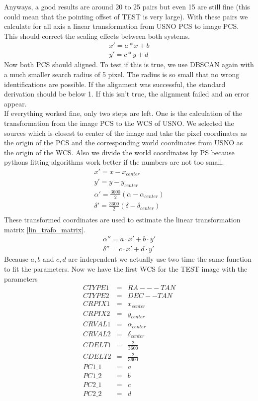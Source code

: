 Anyways, a good results are around 20 to 25 pairs but even 15 are still fine (this could mean that the pointing offset of TEST is very large). With these pairs we calculate for all axis a linear transformation from USNO PCS to image PCS. This should correct the scaling effects between both systems.
\begin{eqnarray}
	x' = a*x+b\\
	y' = c*y+d
\end{eqnarray}
Now both PCS should aligned. To test if this is true, we use DBSCAN again with a much smaller search radius of 5 pixel. The radius is so small that no wrong identifications are possible. If the alignment was successful, the standard derivation should be below 1. If this isn't true, the alignment failed and an error appear.\\
If everything worked fine, only two steps are left. One is the calculation of the transformation from the image PCS to the WCS of USNO. We selected the sources which is closest to center of the image and take the pixel coordinates as the origin of the PCS and the corresponding world coordinates from USNO as the origin of the WCS. Also we divide the world coordinates by PS because pythons fitting algorithms work better if the numbers are not too small.
\begin{eqnarray}
	x' = x - x_{center}\\
	y' = y - y_{center}\\
	\alpha ' = \frac{3600}{2}(\alpha - \alpha_{center})\\
	\delta ' = \frac{3600}{2}(\delta - \delta_{center})\\
\end{eqnarray}
These transformed coordinates are used to estimate the linear transformation matrix \eqref{lin_trafo_matrix}.
\begin{eqnarray}
	\alpha '' = a \cdot x' + b \cdot y' \\
	\delta '' = c \cdot x' + d \cdot y'
	\label{lin_trafo_matrix}
\end{eqnarray}
Because $a, b$ and $c, d$ are independent we actually use two time the same function to fit the parameters. Now we have the first WCS for the TEST image with the parameters
\begin{eqnarray}
	CTYPE1 &=& RA---TAN\\
	CTYPE2 &=& DEC--TAN\\
	CRPIX1 &=& x_{center}\\
	CRPIX2 &=& y_{center}\\
	CRVAL1 &=& \alpha_{center}\\
	CRVAL2 &=& \delta_{center}\\
	CDELT1 &=& \frac{2}{3600}\\
	CDELT2 &=& \frac{2}{3600}\\
	PC1\_1 &=& a\\
	PC1\_2 &=& b\\
	PC2\_1 &=& c\\
	PC2\_2 &=& d
\end{eqnarray}
